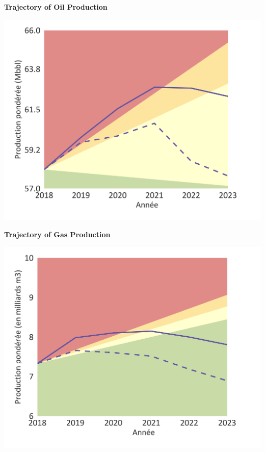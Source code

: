 \documentclass[10pt,table]{article}\usepackage[]{graphicx}\usepackage[]{color}
\begin{document}
	\begin{minipage}[t]{.49\linewidth}
		\textbf{Trajectory of Oil Production }

		\includegraphics[trim = {0 0cm 0 0},width=1\linewidth]{ReportOutputs/Fig11}

	\end{minipage}	
	\hspace{.02\linewidth}
	\begin{minipage}[t]{.49\textwidth}
		\textbf{Trajectory of Gas Production }

		\includegraphics[trim = {0 0cm 0 0},width=1\linewidth]{ReportOutputs/Fig12}

	\end{minipage}
\end{document}
